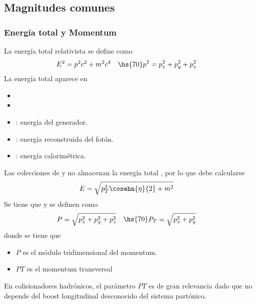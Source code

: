     \subsection{Magnitudes comunes}
        \subsubsection{Energía total y Momentum}
        La energía total relativista se define como
        \begin{equation*}
            \begin{aligned}
                E^{2} & = p^{2}c^{2} + m^{2}c^{4}
            \end{aligned}\hs{70}
            \begin{aligned}
                p^{2} & = p_{x}^{2} + p_{y}^{2} + p_{z}^{2}
            \end{aligned}
        \end{equation*}
        La energía total aparece en
        \begin{itemize}
            \item {}
            \item {}
            \item {}: energía del generador.
            \item {}: energía reconstruida del fotón.
            \item {}: energía calorimétrica.
        \end{itemize}
        Las colecciones de  y  no almacenan la energía total , por lo que debe calcularse
        \begin{equation*}
            \begin{aligned}
                E & = \sqrt{p_{T}^{2}\cosehn{\eta}{2} + m^{2}}
            \end{aligned}
        \end{equation*}
        Se tiene que  y  se definen como
        \begin{equation*}
            \begin{aligned}
                P & = \sqrt{p_{x}^{2} + p_{y}^{2} + p_{z}^{2}}
            \end{aligned}\hs{70}
            \begin{aligned}
                P_{T} & = \sqrt{p_{x}^{2} + p_{y}^{2}}
            \end{aligned}
        \end{equation*}
        donde se tiene que
        \begin{itemize}
            \item $P$ es el módulo tridimensional del momentum.
            \item $PT$ es el momentum transversal
        \end{itemize}
        En colisionadores hadrónicos, el parámetro $PT$ es de gran relevancia dado que no depende del boost longitudinal desconocido del sistema partónico.

